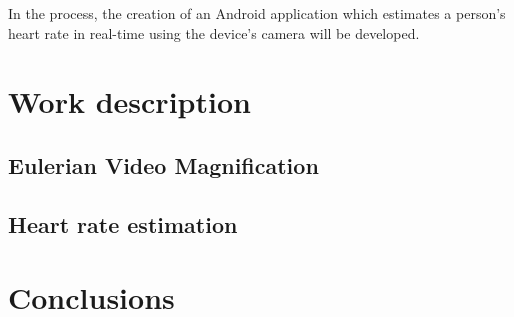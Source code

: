 \documentclass[9pt,a4paper]{extarticle}
\begin{document}
\begin{multicols}{2}
In the process, the creation of an Android application which
estimates a person's heart rate in real-time using the device's camera
will be developed.

\section{Work description}\label{sec:work}


\subsection{Eulerian Video Magnification}\label{sec:work:evm}

\subsection{Heart rate estimation}\label{sec:work:heart}

\section{Conclusions}\label{sec:conclusions}



\end{multicols}
\end{document}
